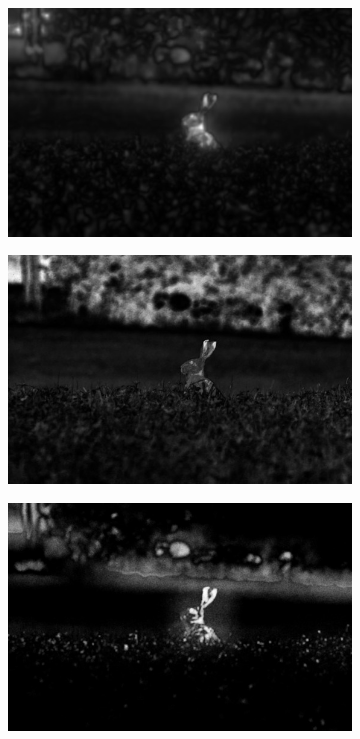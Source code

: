 \begin{figure}[H]
    \begin{subfigure}{0.32\textwidth}
      \centering
      \includegraphics[scale=1.0]{obrazky/IttiSMzajic2.jpg}
      \caption{}
    \end{subfigure}
    \begin{subfigure}{.32\textwidth}
      \centering
      \includegraphics[scale=1.0]{obrazky/AchantaSMzajic2.jpg}
      \caption{}
    \end{subfigure}
    \begin{subfigure}{.32\textwidth}
      \centering
      \includegraphics[scale=1.0]{obrazky/StentifordSMzajic2.jpg}
      \caption{}
    \end{subfigure}
    \vspace{1pt}
    

\end{figure}
